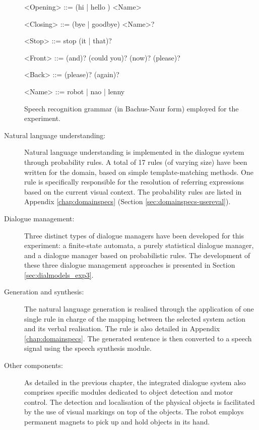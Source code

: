 \begin{description}
\begin{table}[p!]
\begin{grammar}
<Opening> ::= (hi | hello ) <Name>

<Closing> ::= (bye | goodbye) <Name>?

<Stop> ::= stop (it | that)?
 
<Front> ::= (and)? (could you)? (now)? (please)?

<Back> ::= (please)? (again)?

<Name> ::= robot | nao | lenny

\end{grammar}
\caption{Speech recognition grammar (in Bachus-Naur form) employed for the experiment.}
\label{table:asr}
\end{table}

\item[Natural language understanding: ] Natural language understanding is implemented in the dialogue system through probability rules.  A total of 17 rules (of varying size) have been written for the domain, based on simple template-matching methods. One rule is specifically responsible for the resolution of referring expressions based on the current visual context. The probability rules are listed in Appendix \ref{chap:domainspecs} (Section \ref{sec:domainspecs-usereval}). 

\item[Dialogue management: ] Three distinct types of dialogue managers have been developed for this experiment: a finite-state automata, a purely statistical dialogue manager, and a dialogue manager based on probabilistic rules.  The development of these three dialogue management approaches is presented in Section \ref{sec:dialmodels_exp3}. 

\item[Generation and synthesis: ] The natural language generation is realised through the application of one single rule in charge of the mapping between the selected system action and its verbal realisation. The rule is also detailed in Appendix \ref{chap:domainspecs}.  The generated sentence is then converted to a speech signal using the speech synthesis module.

\item [Other components: ] As detailed in the previous chapter, the integrated dialogue system also comprises specific modules dedicated to object detection and motor control.  The detection and localisation of the physical objects is facilitated by the use of visual markings on top of the objects.  The robot employs permanent magnets to pick up and hold objects in its hand. 

\end{description}

